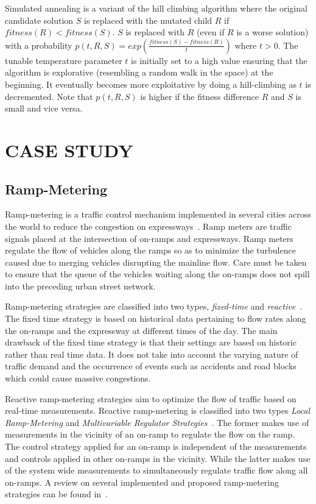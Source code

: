 \documentclass{wscpaperproc}
\theoremstyle{wsc}
\begin{document}
Simulated annealing is a variant of the hill climbing algorithm where the original candidate solution $S$ is replaced with the mutated child $R$ if $fitness(R)<fitness(S)$. $S$ is replaced with $R$ (even if $R$ is a worse solution) with a probability  $p(t,R,S)=exp(\frac{fitness(S)-fitness(R)}{t})$ where $t>0$. The tunable temperature parameter $t$ is initially set to a high value ensuring that the algorithm is explorative (resembling a random walk in the space) at the beginning. It eventually becomes more exploitative by doing a hill-climbing as $t$ is decremented. Note that $p(t,R,S)$ is higher if the fitness difference $R$ and $S$ is small and vice versa. 

\section{CASE STUDY}
\label{sec:case-study}
\subsection{Ramp-Metering}
\label{subsec:ramp-metering}
Ramp-metering is a traffic control mechanism implemented in several cities across the world to reduce the congestion on expressways~\cite{bogenberger1999advanced}. Ramp meters are traffic signals placed at the intersection of on-ramps and expressways. Ramp meters regulate the flow of vehicles along the ramps so as to minimize the turbulence caused due to merging vehicles disrupting the mainline flow. Care must be taken to ensure that the queue of the vehicles waiting along the on-ramps does not spill into the preceding urban street network. 

Ramp-metering strategies are classified into two types, {\it fixed-time} and {\it reactive}~. The fixed time strategy is based on historical data pertaining to flow rates along the on-ramps and the expressway at different times of the day. The main drawback of the fixed time strategy is that their settings are based on historic rather than real time data. It does not take into account the varying nature of traffic demand and the occurrence of events such as accidents and road blocks which could cause massive congestions. 

Reactive ramp-metering strategies aim to optimize the flow of traffic based on real-time measurements. Reactive ramp-metering is classified into two types {\it Local Ramp-Metering} and {\it Multivariable Regulator Strategies}~.  The former makes use of measurements in the vicinity of an on-ramp to regulate the flow on the ramp. The control strategy applied for an on-ramp is independent of the measurements and controls applied in other on-ramps in the vicinity. While the latter makes use of the system wide measurements to simultaneously regulate traffic flow along all on-ramps. A review on several implemented and proposed ramp-metering strategies can be found in~\cite{bogenberger1999advanced}.
\end{document}
